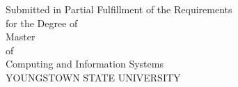 \documentclass[12pt]{article}
\renewcommand{\baselinestretch}{2.0}
\begin{document}
\maketitle %
\thispagestyle{empty} %

\begin{center}
Submitted in Partial Fulfillment of the Requirements
\\for the Degree of 
\\Master 
\\of 
\\Computing and Information Systems
\\ [0.8in]
YOUNGSTOWN STATE UNIVERSITY\\
\date{MM, YYYY}

\newpage
\begin{flushleft}


\newpage
\renewcommand{\baselinestretch}{2.0}

\newpage

\end{flushleft}
\newpage
 
\tableofcontents 
\newpage
\listoffigures
\newpage
\listoftables
\newpage 

\end{center}
\newpage







\newpage

\newpage

\end{document}
